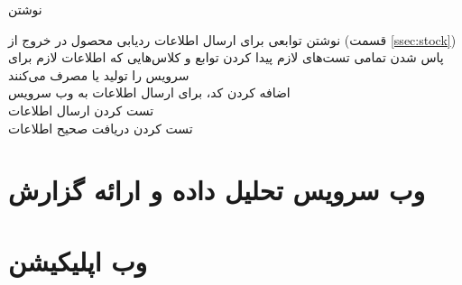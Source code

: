 \begin{wbsbox}{نوشتن }
\begin{wbssub}
{نوشتن توابعی برای ارسال اطلاعات ردیابی محصول در خروج از  (قسمت \ref{ssec:stock}\hspace{1mm})}
{پاس شدن تمامی تست‌های لازم}
پیدا کردن توابع و کلاس‌هایی که اطلاعات لازم برای سرویس را تولید یا مصرف می‌کنند \\
\task 
اضافه کردن کد، برای ارسال اطلاعات به وب ‌سرویس \\
\task
تست کردن ارسال اطلاعات \\
\task
تست کردن دریافت صحیح اطلاعات
\end{wbssub}
\end{wbsbox}

\section{وب سرویس تحلیل داده و ارائه گزارش}

\section{وب اپلیکیشن}